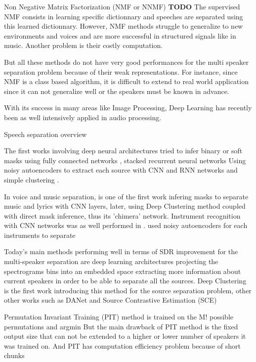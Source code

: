 \documentclass[master,final,11pt]{iscs-thesis}
\begin{document}
Non Negative Matrix Factorization (NMF or NNMF) \textbf{TODO}
The supervised NMF consists in learning specific dictionnary and speeches are separated using this learned dictionnary.
However, NMF methods struggle to generalize to new environments and voices and are more successful in structured signals like in music. Another problem is their costly computation.

But all these methods do not have very good performances for the multi speaker separation problem because of their weak representations. For instance, since NMF is a class based algorithm, it is difficult to extend to real world application since it can not generalize well or the speakers must be known in advance.

With its success in many areas like Image Processing, Deep Learning has recently been as well intensively applied in audio processing.

Speech separation overview \cite{OverviewSSDL, DLSS, LSTMSS, SpeechEnh}

The first works involving deep neural architectures tried to infer binary or soft masks using fully connected networks \cite{DNNSS, MASKDNN, MasksDNN, MASKDNN2}, stacked recurrent neural networks \cite{RNNSS, DNNSS2}
Using noisy autoencoders to extract each source with CNN and RNN networks \cite{AESS, AESS2} and simple clustering \cite{AESSsimple}.

In voice and music separation, \cite{Karaoke} is one of the first work infering masks to separate music and lyrics with CNN layers, later, \cite{chimera} using Deep Clustering method coupled with direct mask inference, thus its 'chimera' network. Instrument recognition with CNN networks was as well performed in \cite{CNNrecog}. \cite{AESS} used noisy autoencoders for each instruments to separate

Today's main methods performing well in terms of SDR improvement for the multi-speaker separation are deep learning architectures projecting the spectrograms bins into an embedded space extracting more information about current speakers in order to be able to separate all the sources. Deep Clustering  \cite{DPCL} is the first work introducing this method for the source separation problem, other other works such as DANet \cite{DANet} and Source Contrastive Estimation (SCE) 

Permutation Invariant Training (PIT) \cite{PIT, PIT1, PIT_recog} method is trained on the M! possible permutations and argmin
But the main drawback of PIT method is the fixed output size that can not be extended to a higher or lower number of speakers it was trained on. And PIT has computation efficiency problem because of short chunks
\end{document}
